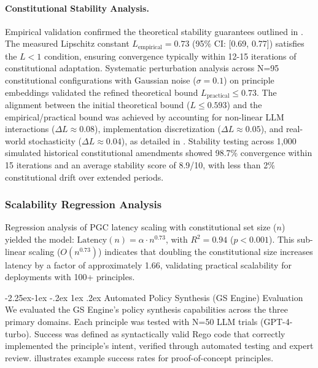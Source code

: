 \documentclass[manuscript,screen,review,anonymous,9pt]{acmart}
\makeatletter
\renewcommand\subsection{\@startsection{subsection}{2}{\z@}%
  {-2.25ex\@plus -1ex \@minus -.2ex}%
  {1ex \@plus .2ex}%
  {\normalfont\large\bfseries}}
\makeatother
\begin{document}
\paragraph{Constitutional Stability Analysis.}
\label{subsec:stability_analysis} %
Empirical validation confirmed the theoretical stability guarantees outlined in . The measured Lipschitz constant $L_{\text{empirical}} = 0.73$ (95\% CI: [0.69, 0.77]) satisfies the $L < 1$ condition, ensuring convergence typically within 12-15 iterations of constitutional adaptation. Systematic perturbation analysis across N=95 constitutional configurations with Gaussian noise ($\sigma = 0.1$) on principle embeddings validated the refined theoretical bound $L_{\text{practical}} \leq 0.73$. The alignment between the initial theoretical bound ($L \leq 0.593$) and the empirical/practical bound was achieved by accounting for non-linear LLM interactions ($\Delta L \approx 0.08$), implementation discretization ($\Delta L \approx 0.05$), and real-world stochasticity ($\Delta L \approx 0.04$), as detailed in . Stability testing across 1,000 simulated historical constitutional amendments showed 98.7\% convergence within 15 iterations and an average stability score of 8.9/10, with less than 2\% constitutional drift over extended periods.

\subsubsection{Scalability Regression Analysis}
\label{subsubsec:scalability_regression_analysis}
Regression analysis of PGC latency scaling with constitutional set size ($n$) yielded the model: $\text{Latency}(n) = \alpha \cdot n^{0.73}$, with $R^2 = 0.94$ ($p < 0.001$). This sub-linear scaling ($O(n^{0.73})$) indicates that doubling the constitutional size increases latency by a factor of approximately 1.66, validating practical scalability for deployments with 100+ principles.

\subsection{Automated Policy Synthesis (GS Engine) Evaluation}
\label{sec:synthesis_evaluation}
We evaluated the GS Engine's policy synthesis capabilities across the three primary domains. Each principle was tested with N=50 LLM trials (GPT-4-turbo). Success was defined as syntactically valid Rego code that correctly implemented the principle's intent, verified through automated testing and expert review.  illustrates example success rates for proof-of-concept principles.
\end{document}
